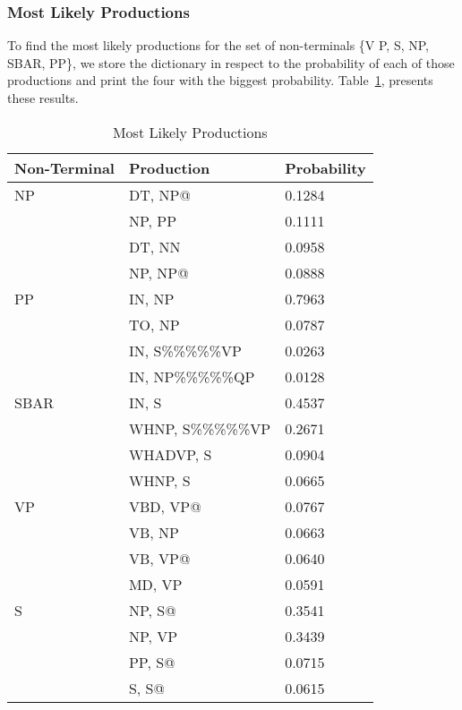 \documentclass[a4paper,11pt]{article}
\begin{document}
\subsubsection{Most Likely Productions}
To find the most likely productions for the set of non-terminals \{V P, S, NP, SBAR, PP\}, we store the dictionary in respect to the probability of each of those productions and print the four with the biggest probability. Table~\ref{most}, presents these results.
\begin{table}[h!]
\label{most}
\caption{Most Likely Productions}
\begin{center}
\begin{scriptsize}
    \begin{tabular}{l l l}
    \hline
    \hline
    \textbf{Non-Terminal} & \textbf{Production} & \textbf{Probability} \\ \hline
	NP & DT, NP@ & 0.1284 \\
	&NP, PP &0.1111\\
	&DT, NN &0.0958\\
	&NP, NP@ &0.0888\vspace{0.1cm} \\
	PP & IN, NP & 0.7963 \\
	&TO, NP &0.0787\\
	&IN, S\%\%\%\%\%VP &0.0263\\
	&IN, NP\%\%\%\%\%QP& 0.0128\vspace{0.1cm} \\
	SBAR & IN, S & 0.4537 \\
	&WHNP, S\%\%\%\%\%VP& 0.2671\\
	&WHADVP, S &0.0904\\
	&WHNP, S &0.0665\vspace{0.1cm} \\
	VP & VBD, VP@  &0.0767 \\
	&VB, NP &0.0663\\
	&VB, VP@& 0.0640\\
	&MD, VP &0.0591\vspace{0.1cm} \\
	S & NP, S@ & 0.3541 \\
	&NP, VP& 0.3439 \\
	&PP, S@ & 0.0715 \\
	&S, S@& 0.0615 \\
  \hline
  \end{tabular}
  \end{scriptsize}
  \end{center}
\end{table}
\end{document}
